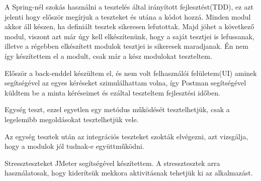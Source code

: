 A Spring-nél szokás használni a tesztelés által irányított fejlesztést(TDD), ez azt jelenti hogy először megírjuk a teszteket és utána a kódot hozzá. Minden modul akkor áll készen, ha definiált tesztek sikeresen lefutottak. Majd jöhet a következő modul, viszont azt már úgy kell elkészítenünk, hogy a saját tesztjei is lefussanak, illetve a régebben elkészített modulok tesztjei is sikeresek maradjanak. Én nem így készítettem el a modult, csak már a kész modulokat teszteltem.

Először a back-enddel készültem el, és nem volt felhasználói felületem(UI) aminek segítségével az egyes kéréseket szimulálhattam volna, így Postman segítségével küldtem be a minta kéréseimet és ezáltal teszteltem fejlesztési időben. 

Egység teszt, ezzel egyetlen egy metódus működését tesztelhetjük, csak a  legelemibb megoldásokat tesztelhetjük vele.

Az egység tesztek után az integrációs teszteket szokták elvégezni, azt vizsgálja, hogy a modulok jól tudnak-e együttműködni.

Stresszteszteket JMeter segítségével készítettem. A stressztesztek arra használatosak, hogy kiderítsük mekkora aktivitásnak tehetjük ki az alkalmazást.